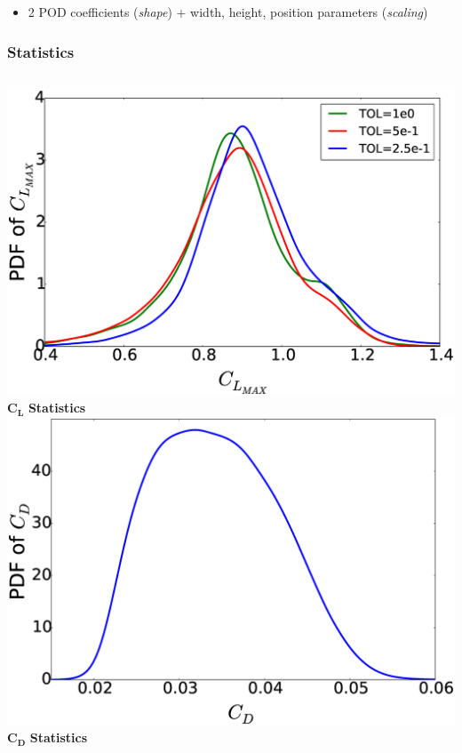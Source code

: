 \documentclass[9pt]{beamer}
\begin{document}
\begin{frame}
\begin{itemize}
\item 2 POD coefficients (\emph{shape}) + width, height, position parameters (\emph{scaling})
\end{itemize}
\end{frame}
\begin{frame}
\frametitle{Statistics}
\label{sec-3-4}


\begin{columns}[c]
    \centering
    \includegraphics[width=1\textwidth]{PDFCLMAX} \\
    $\bm{C_L}$ {\bf Statistics}
    \centering
    \includegraphics[width=1\textwidth]{PDFCDMAX} \\
    $\bm{C_D}$ {\bf Statistics}
\end{columns}




\end{frame}
\end{document}
